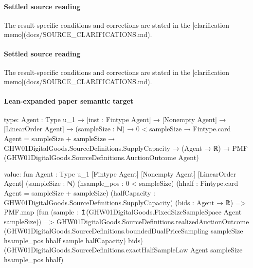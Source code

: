 \documentclass[10pt]{article}
\begin{document}
\paragraph{Settled source reading}
\begin{sloppypar}
The result-\allowbreak{}specific conditions and corrections are stated in the [clarification memo](docs/\allowbreak{}SOURCE\_\allowbreak{}CLARIFICATIONS.\allowbreak{}md).\allowbreak{}
\end{sloppypar}
\paragraph{Settled source reading}
\begin{sloppypar}
The result-\allowbreak{}specific conditions and corrections are stated in the [clarification memo](docs/\allowbreak{}SOURCE\_\allowbreak{}CLARIFICATIONS.\allowbreak{}md).\allowbreak{}
\end{sloppypar}

\paragraph{Lean-expanded paper semantic target}
\begin{ReviewVerbatim}
type:
{Agent : Type u_1} →
  [inst : Fintype Agent] →
    [Nonempty Agent] →
      [LinearOrder Agent] →
        (sampleSize : ℕ) →
          0 < sampleSize →
            Fintype.card Agent = sampleSize + sampleSize →
              GHW01DigitalGoods.SourceDefinitions.SupplyCapacity →
                (Agent → ℝ) → PMF (GHW01DigitalGoods.SourceDefinitions.AuctionOutcome Agent)

value:
fun {Agent : Type u_1} [Fintype Agent] [Nonempty Agent] [LinearOrder Agent] (sampleSize : ℕ)
    (hsample_pos : 0 < sampleSize) (hhalf : Fintype.card Agent = sampleSize + sampleSize)
    (halfCapacity : GHW01DigitalGoods.SourceDefinitions.SupplyCapacity) (bids : Agent → ℝ) =>
  PMF.map
    (fun (sample : ↥(GHW01DigitalGoods.FixedSizeSampleSpace Agent sampleSize)) =>
      GHW01DigitalGoods.SourceDefinitions.realizedAuctionOutcome
        (GHW01DigitalGoods.SourceDefinitions.boundedDualPriceSampling sampleSize hsample_pos hhalf sample halfCapacity)
        bids)
    (GHW01DigitalGoods.SourceDefinitions.exactHalfSampleLaw Agent sampleSize hsample_pos hhalf)
\end{ReviewVerbatim}
\end{document}
